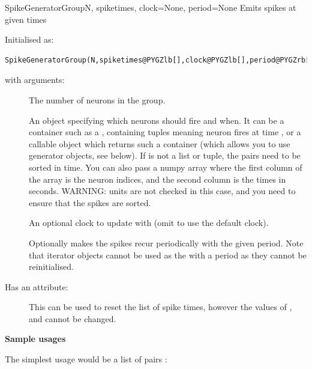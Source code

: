\documentclass[letterpaper,10pt,english]{manual}
\begin{document}
\hypertarget{brian.SpikeGeneratorGroup}{}\begin{classdesc}{SpikeGeneratorGroup}{N, spiketimes, clock=None, period=None}
Emits spikes at given times

Initialised as:

\begin{Verbatim}[commandchars=@\[\]]
SpikeGeneratorGroup(N,spiketimes@PYGZlb[],clock@PYGZlb[],period@PYGZrb[]@PYGZrb[])
\end{Verbatim}

with arguments:
\begin{description}
\item[] \leavevmode
The number of neurons in the group.

\item[] \leavevmode
An object specifying which neurons should fire and when. It can be a container
such as a , containing tuples  meaning neuron  fires at
time , or a callable object which returns such a container (which
allows you to use generator objects, see below). If  is not
a list or tuple, the pairs  need to be sorted in time. You can
also pass a numpy array  where the first column of the
array is the neuron indices, and the second column is the times in
seconds. WARNING: units are not checked in this case, and you need to
ensure that the spikes are sorted.

\item[] \leavevmode
An optional clock to update with (omit to use the default clock).

\item[] \leavevmode
Optionally makes the spikes recur periodically with the given
period. Note that iterator objects cannot be used as the 
with a period as they cannot be reinitialised.

\end{description}

Has an attribute:
\begin{description}
\item[] \leavevmode
This can be used to reset the list of spike times, however the values of
,  and  cannot be changed.

\end{description}

\textbf{Sample usages}

The simplest usage would be a list of pairs :


\end{classdesc}
\end{document}
